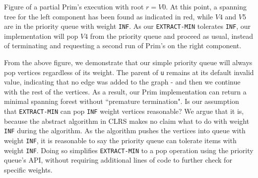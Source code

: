 \newline
\begin{center}
\newline
Figure of a partial Prim's execution with root $r = V0$. At this point, a spanning tree for the left component has been found as indicated in red, while $V4$ and $V5$ are in the priority queue with weight \texttt{INF}. As our \texttt{EXTRACT-MIN} tolerates \texttt{INF}, our implementation will pop $V4$ from the priority queue and proceed as usual, instead of terminating and requesting a second run of Prim's on the right component.
\newline
\end{center}
From the above figure, we demonstrate that our simple priority queue will always pop vertices regardless of its weight. The parent of \texttt{u} remains at its default invalid value, indicating that no edge was added to the graph - and then we continue with the rest of the vertices. As a result, our Prim implementation can return a minimal spanning forest without ``premature termination".
\newline\newline
Is our assumption that \texttt{EXTRACT-MIN} can pop \texttt{INF} weight vertices reasonable? We argue that it is, because the abstract algorithm in CLRS makes no claim what to do with weight \texttt{INF} during the algorithm. As the algorithm pushes the vertices into queue with weight \texttt{INF}, it is reasonable to say the priority queue can tolerate items with weight \texttt{INF}. Doing so simplifies \texttt{EXTRACT-MIN} to a pop operation using the priority queue's API, without requiring additional lines of code to further check for specific weights.
\newline\newline
